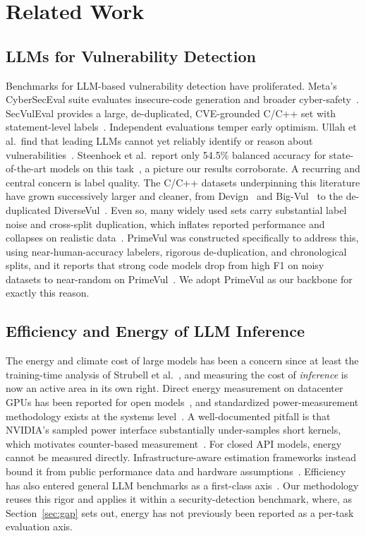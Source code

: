 \documentclass[computers,article,submit,moreauthors]{Definitions/mdpi}
\begin{document}
\section{Related Work}

\subsection{LLMs for Vulnerability Detection}
Benchmarks for LLM-based vulnerability detection have proliferated. Meta's CyberSecEval suite evaluates insecure-code generation and broader cyber-safety~\citep{cyberseceval}. SecVulEval provides a large, de-duplicated, CVE-grounded C/C++ set with statement-level labels~\citep{secvuleval}. Independent evaluations temper early optimism. Ullah et al.\ find that leading LLMs cannot yet reliably identify or reason about vulnerabilities~\citep{secllmholmes}. Steenhoek et al.\ report only 54.5\% balanced accuracy for state-of-the-art models on this task~\citep{steenhoek}, a picture our results corroborate. A recurring and central concern is label quality. The C/C++ datasets underpinning this literature have grown successively larger and cleaner, from Devign~\citep{devign} and Big-Vul~\citep{bigvul} to the de-duplicated DiverseVul~\citep{diversevul}. Even so, many widely used sets carry substantial label noise and cross-split duplication, which inflates reported performance and collapses on realistic data~\citep{croft,reveal}. PrimeVul was constructed specifically to address this, using near-human-accuracy labelers, rigorous de-duplication, and chronological splits, and it reports that strong code models drop from high F1 on noisy datasets to near-random on PrimeVul~\citep{primevul}. We adopt PrimeVul as our backbone for exactly this reason.

\subsection{Efficiency and Energy of LLM Inference}
The energy and climate cost of large models has been a concern since at least the training-time analysis of Strubell et al.~\citep{strubell}, and measuring the cost of \emph{inference} is now an active area in its own right. Direct energy measurement on datacenter GPUs has been reported for open models~\citep{luccioni,samsi}, and standardized power-measurement methodology exists at the systems level~\citep{mlperfpower}. A well-documented pitfall is that NVIDIA's sampled power interface substantially under-samples short kernels, which motivates counter-based measurement~\citep{parttime}. For closed API models, energy cannot be measured directly. Infrastructure-aware estimation frameworks instead bound it from public performance data and hardware assumptions~\citep{jegham}. Efficiency has also entered general LLM benchmarks as a first-class axis~\citep{helm,tokenpowerbench}. Our methodology reuses this rigor and applies it within a security-detection benchmark, where, as Section~\ref{sec:gap} sets out, energy has not previously been reported as a per-task evaluation axis.
\end{document}
